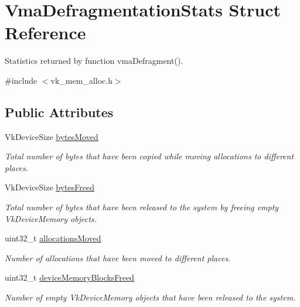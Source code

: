 \hypertarget{structVmaDefragmentationStats}{}\section{Vma\+Defragmentation\+Stats Struct Reference}
\label{structVmaDefragmentationStats}


Statistics returned by function vma\+Defragment().  




{\ttfamily \#include $<$vk\+\_\+mem\+\_\+alloc.\+h$>$}

\subsection*{Public Attributes}
\begin{DoxyCompactItemize}
\item 
\mbox{\label{structVmaDefragmentationStats_a36f9d5df2a10ba2a36b16e126d60572d}} 
Vk\+Device\+Size \hyperlink{structVmaDefragmentationStats_a36f9d5df2a10ba2a36b16e126d60572d}{bytes\+Moved}
\begin{DoxyCompactList}\small\item\em Total number of bytes that have been copied while moving allocations to different places. \end{DoxyCompactList}\item 
\mbox{\label{structVmaDefragmentationStats_ab0cb9ac0dbc106c77e384ea676422f28}} 
Vk\+Device\+Size \hyperlink{structVmaDefragmentationStats_ab0cb9ac0dbc106c77e384ea676422f28}{bytes\+Freed}
\begin{DoxyCompactList}\small\item\em Total number of bytes that have been released to the system by freeing empty {\ttfamily Vk\+Device\+Memory} objects. \end{DoxyCompactList}\item 
\mbox{\label{structVmaDefragmentationStats_aefeabf130022008eadd75999478af3f9}} 
uint32\+\_\+t \hyperlink{structVmaDefragmentationStats_aefeabf130022008eadd75999478af3f9}{allocations\+Moved}
\begin{DoxyCompactList}\small\item\em Number of allocations that have been moved to different places. \end{DoxyCompactList}\item 
\mbox{\label{structVmaDefragmentationStats_a0113f1877904a5d1ee8f409216ff276b}} 
uint32\+\_\+t \hyperlink{structVmaDefragmentationStats_a0113f1877904a5d1ee8f409216ff276b}{device\+Memory\+Blocks\+Freed}
\begin{DoxyCompactList}\small\item\em Number of empty {\ttfamily Vk\+Device\+Memory} objects that have been released to the system. \end{DoxyCompactList}\end{DoxyCompactItemize}


